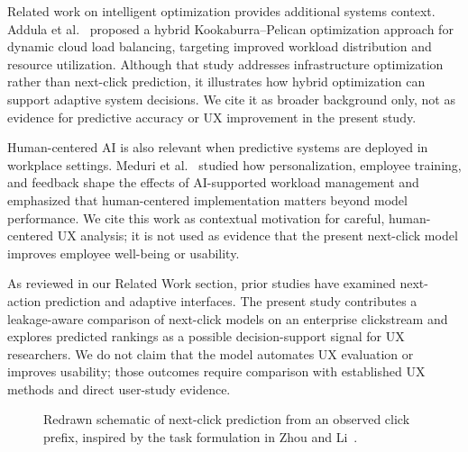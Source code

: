 \documentclass[sn-mathphys-num, Numbered]{sn-jnl}%
\theoremstyle{thmstyleone}%
\theoremstyle{thmstyletwo}%
\theoremstyle{thmstylethree}%
\begin{document}
Related work on intelligent optimization provides additional systems context. Addula et al.~\cite{addula2024kookaburra} proposed a hybrid Kookaburra--Pelican optimization approach for dynamic cloud load balancing, targeting improved workload distribution and resource utilization. Although that study addresses infrastructure optimization rather than next-click prediction, it illustrates how hybrid optimization can support adaptive system decisions. We cite it as broader background only, not as evidence for predictive accuracy or UX improvement in the present study.

Human-centered AI is also relevant when predictive systems are deployed in workplace settings. Meduri et al.~\cite{meduri2024human} studied how personalization, employee training, and feedback shape the effects of AI-supported workload management and emphasized that human-centered implementation matters beyond model performance. We cite this work as contextual motivation for careful, human-centered UX analysis; it is not used as evidence that the present next-click model improves employee well-being or usability.


As reviewed in our Related Work section, prior studies have examined next-action prediction and adaptive interfaces. The present study contributes a leakage-aware comparison of next-click models on an enterprise clickstream and explores predicted rankings as a possible decision-support signal for UX researchers. We do not claim that the model automates UX evaluation or improves usability; those outcomes require comparison with established UX methods and direct user-study evidence.


\begin{figure}
	\centering
{}
\caption{Redrawn schematic of next-click prediction from an observed click prefix, inspired by the task formulation in Zhou and Li~\cite{zhou2021large}.}
	\label{fig:examplecontacts}
\end{figure}
\end{document}
